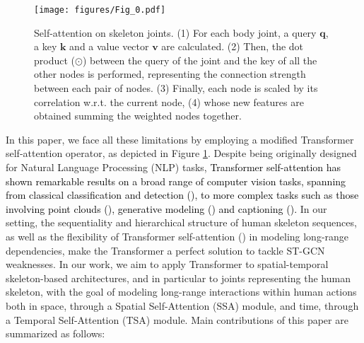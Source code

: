 \documentclass[times,twocolumn,final,authoryear]{elsarticle}
\DeclareRobustCommand{\new}[1]
{{\textcolor{black}{#1}}}
\begin{document}
 \begin{figure}[t]
    \centering
    \texttt{[image: figures/Fig\_0.pdf]}
    \caption{{Self-attention on skeleton joints}. (1) For each body joint, a query $\mathbf{q}$, a key $\mathbf{k}$ and a value vector $\mathbf{v}$ are calculated. (2) Then, the dot product ($\odot$) between the query of the joint and the key of all the other nodes is performed, representing the connection strength between each pair of nodes. (3) Finally, each node is scaled by its correlation w.r.t. the current node, (4) whose new features are obtained summing the weighted nodes together. 
    }
    \label{fig0}
\end{figure}

In this paper, we face all these limitations by employing a modified Transformer self-attention operator, as depicted in Figure \ref{fig0}. Despite being originally designed for Natural Language Processing (NLP) tasks, \new{Transformer self-attention has shown remarkable results on a broad range of computer vision tasks, spanning from classical classification and detection (\cite{dosovitskiy2020image,Bello_2019_ICCV,non-local,carion2020end}), to more complex tasks such as those involving point clouds (\cite{zhao2020point}), generative modeling (\cite{oord2016conditional,parmar2018image}) and captioning (\cite{he2020image}).}
In our setting, the sequentiality and hierarchical structure of human skeleton sequences, as well as the flexibility of Transformer self-attention (\cite{attention}) in modeling long-range dependencies, make the Transformer a perfect solution to tackle ST-GCN weaknesses. In our work, we aim to apply Transformer to spatial-temporal skeleton-based architectures, and in particular to joints representing the human skeleton, with the goal of modeling long-range interactions within human actions both in space, through a Spatial Self-Attention (SSA) module, and time, through a Temporal Self-Attention (TSA) module.
Main contributions of this paper are summarized as follows: 
\end{document}
